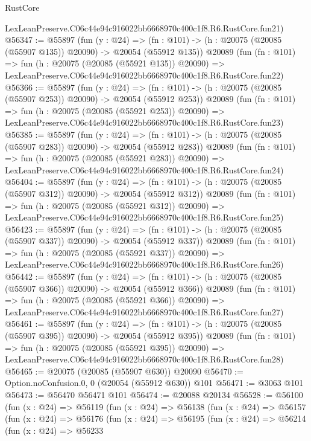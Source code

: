 \begin{lexlean}{RustCore}
\begin{coremodule}
    LexLeanPreserve.C06c44e94c916022bb6668970c400c1f8.R6.RustCore.fun21)
@56347 := @55897
    (fun (y : @24) =>
    (fn : @101) -> (h : @20075 (@20085 (@55907 @135)) @20090) -> @20054 (@55912 @135))
    @20089
    (fun (fn : @101) =>
    fun (h : @20075 (@20085 (@55921 @135)) @20090) =>
    LexLeanPreserve.C06c44e94c916022bb6668970c400c1f8.R6.RustCore.fun22)
@56366 := @55897
    (fun (y : @24) =>
    (fn : @101) -> (h : @20075 (@20085 (@55907 @253)) @20090) -> @20054 (@55912 @253))
    @20089
    (fun (fn : @101) =>
    fun (h : @20075 (@20085 (@55921 @253)) @20090) =>
    LexLeanPreserve.C06c44e94c916022bb6668970c400c1f8.R6.RustCore.fun23)
@56385 := @55897
    (fun (y : @24) =>
    (fn : @101) -> (h : @20075 (@20085 (@55907 @283)) @20090) -> @20054 (@55912 @283))
    @20089
    (fun (fn : @101) =>
    fun (h : @20075 (@20085 (@55921 @283)) @20090) =>
    LexLeanPreserve.C06c44e94c916022bb6668970c400c1f8.R6.RustCore.fun24)
@56404 := @55897
    (fun (y : @24) =>
    (fn : @101) -> (h : @20075 (@20085 (@55907 @312)) @20090) -> @20054 (@55912 @312))
    @20089
    (fun (fn : @101) =>
    fun (h : @20075 (@20085 (@55921 @312)) @20090) =>
    LexLeanPreserve.C06c44e94c916022bb6668970c400c1f8.R6.RustCore.fun25)
@56423 := @55897
    (fun (y : @24) =>
    (fn : @101) -> (h : @20075 (@20085 (@55907 @337)) @20090) -> @20054 (@55912 @337))
    @20089
    (fun (fn : @101) =>
    fun (h : @20075 (@20085 (@55921 @337)) @20090) =>
    LexLeanPreserve.C06c44e94c916022bb6668970c400c1f8.R6.RustCore.fun26)
@56442 := @55897
    (fun (y : @24) =>
    (fn : @101) -> (h : @20075 (@20085 (@55907 @366)) @20090) -> @20054 (@55912 @366))
    @20089
    (fun (fn : @101) =>
    fun (h : @20075 (@20085 (@55921 @366)) @20090) =>
    LexLeanPreserve.C06c44e94c916022bb6668970c400c1f8.R6.RustCore.fun27)
@56461 := @55897
    (fun (y : @24) =>
    (fn : @101) -> (h : @20075 (@20085 (@55907 @395)) @20090) -> @20054 (@55912 @395))
    @20089
    (fun (fn : @101) =>
    fun (h : @20075 (@20085 (@55921 @395)) @20090) =>
    LexLeanPreserve.C06c44e94c916022bb6668970c400c1f8.R6.RustCore.fun28)
@56465 := @20075 (@20085 (@55907 @630)) @20090
@56470 := Option.noConfusion.{0, 0} (@20054 (@55912 @630)) @101
@56471 := @3063 @101
@56473 := @56470 @56471 @101
@56474 := @20088 @20134
@56528 := @56100
    (fun (x : @24) =>
    @56119
      (fun (x : @24) =>
      @56138
        (fun (x : @24) =>
        @56157
          (fun (x : @24) =>
          @56176
            (fun (x : @24) =>
            @56195
              (fun (x : @24) =>
              @56214
                (fun (x : @24) =>
                @56233

\end{coremodule}
\end{lexlean}
